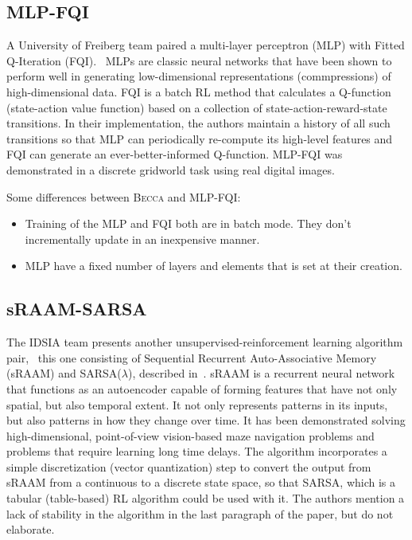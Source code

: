 \subsection{MLP-FQI} 
A University of Freiberg team paired a multi-layer perceptron (MLP) with Fitted Q-Iteration (FQI).~\cite{lange10} MLPs are classic neural networks that have been shown to perform well in generating low-dimensional representations (commpressions) of high-dimensional data. FQI is a batch RL method that calculates a Q-function (state-action value function) based on a collection of state-action-reward-state transitions. In their implementation, the authors maintain a history of all such transitions so that MLP can periodically re-compute its high-level features and FQI can generate an ever-better-informed Q-function. MLP-FQI was demonstrated in a discrete gridworld task using real digital images.

Some differences between \textsc{Becca} and MLP-FQI:

\begin{itemize}
\item Training of the MLP and FQI both are in batch mode. They don't incrementally update in an inexpensive manner.
\item MLP have a fixed number of layers and elements that is set at their creation.
\end{itemize}

\subsection{sRAAM-SARSA} 
The IDSIA team presents another unsupervised-reinforcement learning algorithm pair,~\cite{gisslen11} this one consisting of Sequential Recurrent Auto-Associative Memory (sRAAM) and SARSA($\lambda$), described in~\cite{sutton98}. sRAAM is a recurrent neural network that functions as an autoencoder capable of forming features that have not only spatial, but also temporal extent. It not only represents patterns in its inputs, but also patterns in how they change over time. It has been demonstrated solving high-dimensional, point-of-view vision-based maze navigation problems and problems that require learning long time delays. The algorithm incorporates a simple discretization (vector quantization) step to convert the output from sRAAM from a continuous to a discrete state space, so that SARSA, which is a tabular (table-based) RL algorithm could be used with it. The authors mention a lack of stability in the algorithm in the last paragraph of the paper, but do not elaborate.

